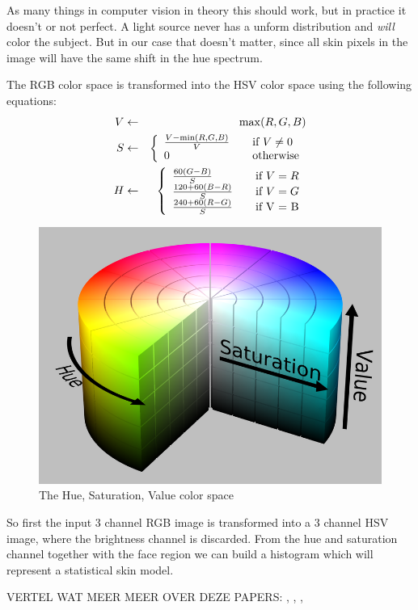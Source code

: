 As many things in computer vision in theory this should work, but in practice it doesn't or not perfect. A light source never has a unform distribution and \emph{will} color the subject. But in our case that doesn't matter, since all skin pixels in the image will have the same shift in the hue spectrum.

The RGB color space is transformed into the HSV color space using the following equations:
\begin{eqnarray*}
  V & \leftarrow & \max(R,G,B) \\
  S & \leftarrow & \left\{
  \begin{array}{l l}
    \frac{V-\min(R, G, B)}{V} & \quad \text{if $V \neq 0$} \\
    0 						  & \quad \text{otherwise} \\
  \end{array} \right.\\
  H & \leftarrow & \left\{
  \begin{array}{l l}
    \frac{60(G - B)}{S}     & \quad \text{if $V = R$} \\
    \frac{120 + 60(B-R)}{S} & \quad \text{if $V = G$} \\
    \frac{240 + 60(R-G)}{S} & \quad \text{if V = B} \\
  \end{array} \right.\\
\end{eqnarray*}

\begin{figure}[htbp]
	\center
	\includegraphics[width=0.4\linewidth]{figures/hsv.png}
	\caption{The Hue, Saturation, Value color space}
	\label{fig:hsv}
\end{figure}

So first the input 3 channel RGB image is transformed into a 3 channel HSV image, where the brightness channel is discarded. From the hue and saturation channel together with the face region we can build a histogram which will represent a statistical skin model.


VERTEL WAT MEER MEER OVER DEZE PAPERS:
\cite{Stenger06template-basedhand}, \cite{Bradski98computervision}, \cite{Cooper07largelexicon},


